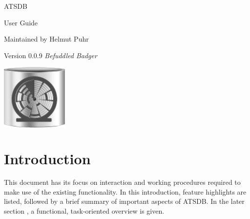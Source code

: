 \documentclass[10pt,letterpaper,extrafontsizes]{memoir}
\begin{document}
\firmlists
\midsloppy
\raggedbottom


%

\frontmatter
\pagestyle{empty}


\vspace*{\fill}
\begin{center}
\HUGE\textsf{ATSDB}\par
\end{center}

\begin{center}
\Huge\textsf{User Guide}\par
\end{center}
\begin{center}
\normalsize\textsf{Maintained by Helmut Puhr}\par
\medskip
\normalsize\textsf{Version 0.0.9 \textit{Befuddled Badger}}\par
\end{center}
\vspace*{\fill}
\begin{center}
\includegraphics[width=\droptitle]{../logo/atsdb.png}
\setlength{\droptitle}{0pt}%
\end{center}
\clearpage

\cleardoublepage

\pagestyle{headings}

\setupshorttoc
\tableofcontents
\clearpage
\setupparasubsecs
\setupmaintoc
\tableofcontents
\setlength{\unitlength}{1pt}
\clearpage
\listoffigures
\clearpage
\listoftables


\chapter{Introduction}

This document has its focus on interaction and working procedures required to make use of the existing
functionality. In this introduction, feature highlights are listed, followed by a brief summary of important aspects of  ATSDB. In the later section , a functional, task-oriented overview is given. 
\end{document}
